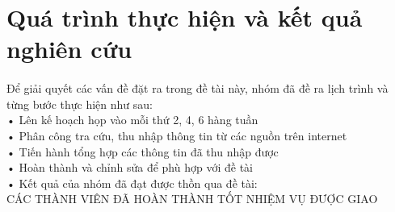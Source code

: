 \documentclass{report}
\newcommand\tab[1][1.25cm]{\hspace*{#1}}
\begin{document}
\section{Quá trình thực hiện và kết quả nghiên cứu}
    \fontsize{13}{10}\selectfont\paragraph{}
        Để giải quyết các vấn đề đặt ra trong đề tài này, nhóm đã đề ra lịch trình và từng bước thực hiện như sau:\\\tab
        •\tab[0.25cm] Lên kế hoạch họp vào mỗi thứ 2, 4, 6 hàng tuần\\\tab
        •\tab[0.25cm] Phân công tra cứu, thu nhập thông tin từ các nguồn trên internet\\\tab
        •\tab[0.25cm] Tiến hành tổng hợp các thông tin đã thu nhập được\\\tab
        •\tab[0.25cm] Hoàn thành và chỉnh sửa để phù hợp với đề tài\\\tab
        •\tab[0.25cm] Kết quả của nhóm đã đạt được thồn qua đề tài:\\
        \tab[2.25cm] CÁC THÀNH VIÊN ĐÃ HOÀN THÀNH TỐT NHIỆM VỤ ĐƯỢC GIAO
    \pagebreak
    
\end{document}
